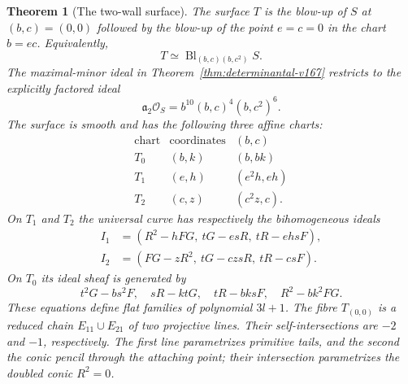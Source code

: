 \documentclass[11pt,reqno]{amsart}
\numberwithin{equation}{section}
\newtheorem{theorem}{Theorem}[section]
\theoremstyle{definition}\newtheorem{definition}[theorem]{Definition}
\theoremstyle{remark}\newtheorem{remark}[theorem]{Remark}
\newcommand{\OO}{\mathcal O}\newcommand{\II}{\mathcal I}
\begin{document}
\begin{theorem}[The two-wall surface]\label{thm:two-wall-v167}
The surface $T$ is the blow-up of $S$ at $(b,c)=(0,0)$ followed
by the blow-up of the point $e=c=0$ in the chart $b=ec$.
Equivalently,
\[
                   T\simeq\operatorname{Bl}_{(b,c)(b,c^2)}S.
\]
The maximal-minor ideal in Theorem~\ref{thm:determinantal-v167}
restricts to the explicitly factored ideal
\begin{equation}\label{eq:slice-minors-v167}
          \mathfrak a_2\OO_S=b^{10}(b,c)^4(b,c^2)^6.
\end{equation}
The surface is smooth and has the following three affine charts:
\begin{equation}\label{eq:three-charts-v167}
 \begin{array}{c|c|c}
 \text{chart}&\text{coordinates}&(b,c)\\ \hline
 T_0&(b,k)&(b,bk)\\
 T_1&(e,h)&(e^2h,eh)\\
 T_2&(c,z)&(c^2z,c).
 \end{array}
\end{equation}
On $T_1$ and $T_2$ the universal curve has respectively the
bihomogeneous ideals
\begin{align}
 I_1&=(R^2-hFG,\ tG-esR,\ tR-ehsF),\label{eq:slice-I1-v167}\\
 I_2&=(FG-zR^2,\ tG-czsR,\ tR-csF).\label{eq:slice-I2-v167}
\end{align}
On $T_0$ its ideal sheaf is generated by
\begin{equation}\label{eq:slice-I0-v167}
 t^2G-bs^2F,\quad sR-ktG,\quad tR-bksF,\quad
                         R^2-bk^2FG.
\end{equation}
These equations define flat families of polynomial $3l+1$.
The fibre $T_{(0,0)}$ is a reduced chain $E_{11}\cup E_{21}$
of two projective lines. Their self-intersections are $-2$ and
$-1$, respectively. The first line parametrizes primitive tails,
and the second the conic pencil through the attaching point;
their intersection parametrizes the doubled conic $R^2=0$.
\end{theorem}
\end{document}
